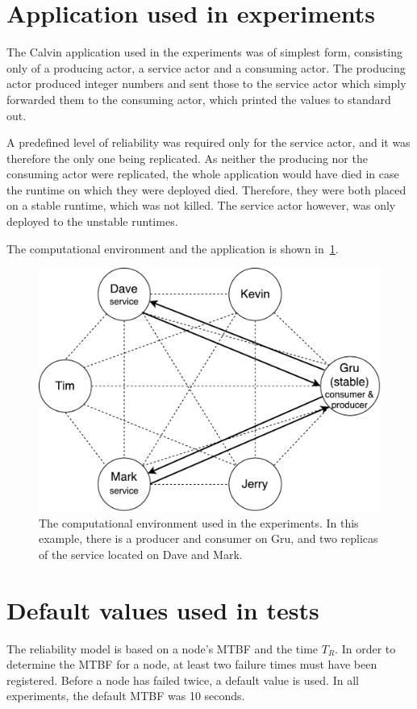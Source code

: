 \documentclass{cslthse-msc}
\begin{document}
\section{Application used in experiments} \label{sec:eval_application}
The Calvin application used in the experiments was of simplest form, consisting only of a producing actor, a service actor and a consuming actor. The producing actor produced integer numbers and sent those to the service actor which simply forwarded them to the consuming actor, which printed the values to standard out. 

A predefined level of reliability was required only for the service actor, and it was therefore the only one being replicated. As neither the producing nor the consuming actor were replicated, the whole application would have died in case the runtime on which they were deployed died. Therefore, they were both placed on a stable runtime, which was not killed. The service actor however, was only deployed to the unstable runtimes.

The computational environment and the application is shown in~\cref{fig:evaluation_application}.

\begin{figure}[!hbt]
\centering
\includegraphics[scale=0.5]{images/evaluation_application.pdf} 
\caption{The computational environment used in the experiments. In this example, there is a producer and consumer on Gru, and two replicas of the service located on Dave and Mark.} \label{fig:evaluation_application}
\end{figure}

\section{Default values used in tests} \label{subsec:eval_default_values}
The reliability model is based on a node's MTBF and the time $T_R$. In order to determine the MTBF for a node, at least two failure times must have been registered. Before a node has failed twice, a default value is used. In all experiments, the default MTBF was 10 seconds.
\end{document}
